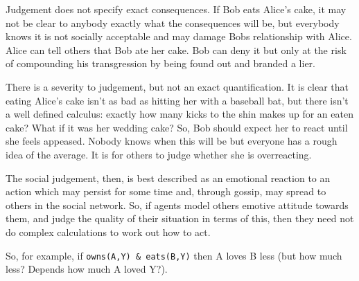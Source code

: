 \documentclass[a4paper]{article}
\begin{document}
Judgement does not specify exact consequences. If Bob eats Alice's cake, it may not be clear to anybody exactly what the consequences will be, but everybody knows it is not socially acceptable and may damage Bobs relationship with Alice. Alice can tell others that Bob ate her cake. Bob can deny it but only at the risk of compounding his transgression by being found out and branded a lier.

There is a severity to judgement, but not an exact quantification. It is clear that eating Alice's cake isn't as bad as hitting her with a baseball bat, but there isn't a well defined calculus: exactly how many kicks to the shin makes up for an eaten cake? What if it was her wedding cake? So, Bob should expect her to react until she feels appeased. Nobody knows when this will be but everyone has a rough idea of the average. It is for others to judge whether she is overreacting.

The social judgement, then, is best described as an emotional reaction to an action which may persist for some time and, through gossip, may spread to others in the social network. So, if agents model others emotive attitude towards them, and judge the quality of their situation in terms of this, then they need not do complex calculations to work out how to act.

So, for example, if \texttt{owns(A,Y) \& eats(B,Y)} then A loves B less (but how much less? Depends how much A loved Y?).
\end{document}

